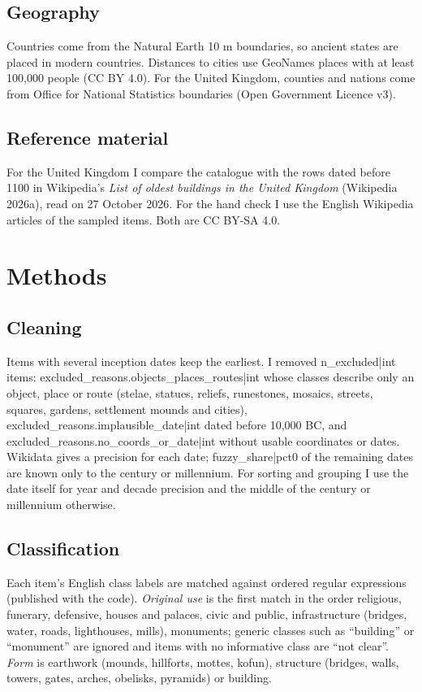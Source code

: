 \documentclass[11pt,a4paper]{article}
\begin{document}
\subsection{Geography}

Countries come from the Natural Earth 10 m boundaries, so ancient states are placed in modern countries. Distances to cities use GeoNames places with at least 100,000 people (CC BY 4.0). For the United Kingdom, counties and nations come from Office for National Statistics boundaries (Open Government Licence v3).

\subsection{Reference material}

For the United Kingdom I compare the catalogue with the rows dated before 1100 in Wikipedia's \emph{List of oldest buildings in the United Kingdom} (Wikipedia 2026a), read on 27 October 2026. For the hand check I use the English Wikipedia articles of the sampled items. Both are CC BY-SA 4.0.

\section{Methods}

\subsection{Cleaning}

Items with several inception dates keep the earliest. I removed {{n_excluded|int}} items: {{excluded_reasons.objects_places_routes|int}} whose classes describe only an object, place or route (stelae, statues, reliefs, runestones, mosaics, streets, squares, gardens, settlement mounds and cities), {{excluded_reasons.implausible_date|int}} dated before 10,000 BC, and {{excluded_reasons.no_coords_or_date|int}} without usable coordinates or dates. Wikidata gives a precision for each date; {{fuzzy_share|pct0}} of the remaining dates are known only to the century or millennium. For sorting and grouping I use the date itself for year and decade precision and the middle of the century or millennium otherwise.

\subsection{Classification}

Each item's English class labels are matched against ordered regular expressions (published with the code). \emph{Original use} is the first match in the order religious, funerary, defensive, houses and palaces, civic and public, infrastructure (bridges, water, roads, lighthouses, mills), monuments; generic classes such as ``building'' or ``monument'' are ignored and items with no informative class are ``not clear''. \emph{Form} is earthwork (mounds, hillforts, mottes, kofun), structure (bridges, walls, towers, gates, arches, obelisks, pyramids) or building.
\end{document}
